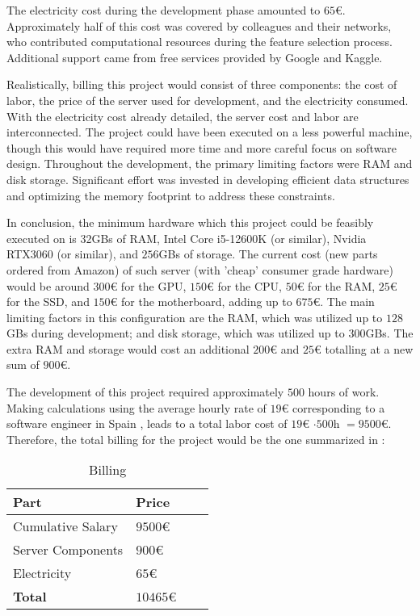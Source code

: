 The electricity cost during the development phase amounted to $65$€. Approximately half of this cost was covered by colleagues and their networks, who contributed computational resources during the feature selection process. Additional support came from free services provided by Google and Kaggle.\par
Realistically, billing this project would consist of three components: the cost of labor, the price of the server used for development, and the electricity consumed. With the electricity cost already detailed, the server cost and labor are interconnected. The project could have been executed on a less powerful machine, though this would have required more time and more careful focus on software design. Throughout the development, the primary limiting factors were RAM and disk storage. Significant effort was invested in developing efficient data structures and optimizing the memory footprint to address these constraints.\par
In conclusion, the minimum hardware which this project could be feasibly executed on is 32GBs of RAM, Intel Core i5-12600K (or similar), Nvidia RTX3060 (or similar), and $256$GBs of storage. The current cost (new parts ordered from Amazon) of such server (with 'cheap' consumer grade hardware) would be around $300$€ for the GPU, $150$€ for the CPU, $50$€ for the RAM, $25$€ for the SSD, and $150$€ for the motherboard, adding up to $675$€. The main limiting factors in this configuration are the RAM, which was utilized up to $128$GBs during development; and disk storage, which was utilized up to $300$GBs. The extra RAM and storage would cost an additional $200$€ and $25$€ totalling at a new sum of $900$€.\par
The development of this project required approximately $500$ hours of work. Making calculations using the average hourly rate of $19$€ corresponding to a software engineer in Spain \cite{salary}, leads to a total labor cost of $19$€ $ \cdot 500$h $ = 9500$€. Therefore, the total billing for the project would be the one summarized in :
\begin{table}[H]
\centering
\begin{tabular}{|l|l|l|l|}
\hline
\textbf{Part} & \textbf{Price} \\ \hline
Cumulative Salary & $9500$€ \\ \hline
Server Components & $900$€ \\ \hline
Electricity & $65$€ \\ \hline
\textbf{Total} & $10465$€ \\ \hline
\end{tabular}
\caption{Billing}
\label{tab:sus2}
\end{table}

